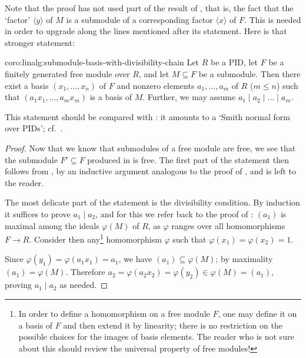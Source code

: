 Note that the proof has not used part of the result of
, that is, the fact that the `factor'
$\langle y \rangle$ of $M$ is a submodule of a corresponding factor
$\langle x \rangle$ of $F$. This is needed in order to upgrade
 along the lines mentioned after its statement. Here
is that stronger statement:
\begin{coro}{}{coro:linalg:submodule-basis-with-divisibility-chain}
  Let $R$ be a PID, let $F$ be a finitely generated free module over
  $R$, and let $M \subseteq F$ be a submodule. Then there exist a
  basis $(x_1, \dots, x_n)$ of $F$ and nonzero elements
  $a_1, \dots, a_m$ of $R$ ($m \leq n$) such that
  $(a_1 x_1, \dots, a_m x_m)$ is a basis of $M$. Further, we may
  assume $a_1 \mid a_2 \mid \dots \mid a_m$.
\end{coro}
This statement should be compared with : it amounts
to a `Smith normal form over PIDs'; cf.\ .
\begin{proof}
  Now that we know that submodules of a free module are free, we see
  that the submodule $F' \subseteq F$ produced in  is
  free. The first part of the statement then follows from
  , by an inductive argument analogous to the proof
  of , and is left to the reader.

  The most delicate part of the statement is the divisibility
  condition.  By induction it suffices to prove $a_1 \mid a_2$, and
  for this we refer back to the proof of : $(a_1)$ is
  maximal among the ideals $\varphi(M)$ of $R$, as $\varphi$ ranges
  over all homomorphisms $F \to R$. Consider then any\footnote{In
    order to define a homomorphism on a free module $F$, one may
    define it on a basis of $F$ and then extend it by linearity; there
    is no restriction on the possible choices for the images of basis
    elements. The reader who is not sure about this should review the
    universal property of free modules!} homomorphism $\varphi$ such
  that $\varphi(x_1) = \varphi(x_2) = 1$.

  Since $\varphi(y_1) = \varphi(a_1x_1) = a_1$, we have
  $(a_1) \subseteq \varphi(M)$; by maximality $(a_1) = \varphi(M)$.
  Therefore
  $a_2 = \varphi(a_2x_2) = \varphi(y_2) \in \varphi(M) = (a_1)$,
  proving $a_1 \mid a_2$ as needed.
\end{proof}

